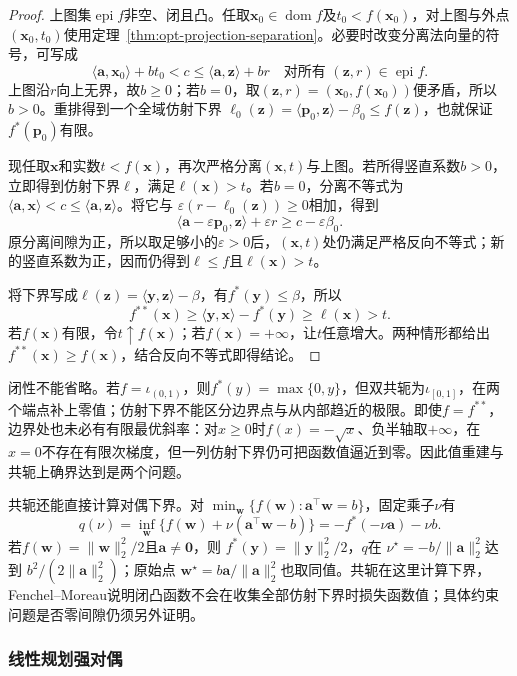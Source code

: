 \begin{proof}
上图集$\operatorname{epi}f$非空、闭且凸。任取$\bm x_0\in\operatorname{dom}f$及$t_0<f(\bm x_0)$，对上图与外点$(\bm x_0,t_0)$使用定理~\ref{thm:opt-projection-separation}。必要时改变分离法向量的符号，可写成
\[
 \langle\bm a,\bm x_0\rangle+b t_0<c
 \leq\langle\bm a,\bm z\rangle+b r
 \quad\text{对所有 }(\bm z,r)\in\operatorname{epi}f.
\]
上图沿$r$向上无界，故$b\geq0$；若$b=0$，取$(\bm z,r)=(\bm x_0,f(\bm x_0))$便矛盾，所以$b>0$。重排得到一个全域仿射下界
$\ell_0(\bm z)=\langle\bm p_0,\bm z\rangle-\beta_0\leq f(\bm z)$，也就保证$f^*(\bm p_0)$有限。

现任取$\bm x$和实数$t<f(\bm x)$，再次严格分离$(\bm x,t)$与上图。若所得竖直系数$b>0$，立即得到仿射下界$\ell$，满足$\ell(\bm x)>t$。若$b=0$，分离不等式为
$\langle\bm a,\bm x\rangle<c\leq\langle\bm a,\bm z\rangle$。将它与
$\varepsilon(r-\ell_0(\bm z))\geq0$相加，得到
\[
 \langle\bm a-\varepsilon\bm p_0,\bm z\rangle+\varepsilon r
 \geq c-\varepsilon\beta_0.
\]
原分离间隙为正，所以取足够小的$\varepsilon>0$后，$(\bm x,t)$处仍满足严格反向不等式；新的竖直系数为正，因而仍得到$\ell\leq f$且$\ell(\bm x)>t$。

将下界写成$\ell(\bm z)=\langle\bm y,\bm z\rangle-\beta$，有$f^*(\bm y)\leq\beta$，所以
\[
 f^{**}(\bm x)\geq\langle\bm y,\bm x\rangle-f^*(\bm y)
 \geq\ell(\bm x)>t.
\]
若$f(\bm x)$有限，令$t\uparrow f(\bm x)$；若$f(\bm x)=+\infty$，让$t$任意增大。两种情形都给出$f^{**}(\bm x)\geq f(\bm x)$，结合反向不等式即得结论。
\end{proof}

闭性不能省略。若$f=\iota_{(0,1)}$，则$f^*(y)=\max\{0,y\}$，但双共轭为$\iota_{[0,1]}$，在两个端点补上零值；仿射下界不能区分边界点与从内部趋近的极限。即使$f=f^{**}$，边界处也未必有有限最优斜率：对$x\geq0$时$f(x)=-\sqrt{x}$、负半轴取$+\infty$，在$x=0$不存在有限次梯度，但一列仿射下界仍可把函数值逼近到零。因此值重建与共轭上确界达到是两个问题。

共轭还能直接计算对偶下界。对
$\min_{\bm w}\{f(\bm w):\bm a^\top\bm w=b\}$，固定乘子$\nu$有
\[
 q(\nu)=\inf_{\bm w}\{f(\bm w)+\nu(\bm a^\top\bm w-b)\}
 =-f^*(-\nu\bm a)-\nu b.
\]
若$f(\bm w)=\lVert\bm w\rVert_2^2/2$且$\bm a\neq\bm0$，则
$f^*(\bm y)=\lVert\bm y\rVert_2^2/2$，$q$在
$\nu^\star=-b/\lVert\bm a\rVert_2^2$达到
$b^2/(2\lVert\bm a\rVert_2^2)$；原始点
$\bm w^\star=b\bm a/\lVert\bm a\rVert_2^2$也取同值。共轭在这里计算下界，Fenchel--Moreau说明闭凸函数不会在收集全部仿射下界时损失函数值；具体约束问题是否零间隙仍须另外证明。

\subsubsection{线性规划强对偶}

